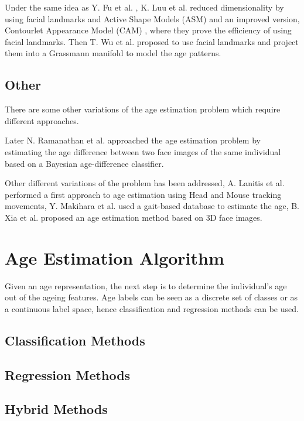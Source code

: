 Under the same idea as Y. Fu et al. \cite{4284917}, K. Luu et al. \cite{Luu:2009:AEU:1736406.1736456, LuuSSBS11} reduced dimensionality by using facial landmarks and Active Shape Models (ASM) \cite{Luu:2009:AEU:1736406.1736456} and an improved version, Contourlet Appearance Model (CAM) \cite{LuuSSBS11}, where they prove the efficiency of using facial landmarks. Then T. Wu et al. \cite{journals/tifs/WuTC12} proposed to use facial landmarks and project them into a Grassmann manifold to model the age patterns.

\subsection{Other}

There are some other variations of the age estimation problem which require different approaches. 

Later N. Ramanathan et al. \cite{1709980} approached the age estimation problem by estimating the age difference between two face images of the same individual based on a Bayesian age-difference classifier.

Other different variations of the problem has been addressed, A. Lanitis et al. \cite{5463396} performed a first approach to age estimation using Head and Mouse tracking movements, Y. Makihara et al. \cite{6117531} used a gait-based database to estimate the age, B. Xia et al. \cite{xia:hal-00904007} proposed an age estimation method based on 3D face images.


\section{Age Estimation Algorithm}
Given an age representation, the next step is to determine the individual's age out of the ageing features. Age labels can be seen as a discrete set of classes or as a continuous label space, hence classification and regression methods can be used.

\subsection{Classification Methods}
\subsection{Regression Methods}
\subsection{Hybrid Methods}

